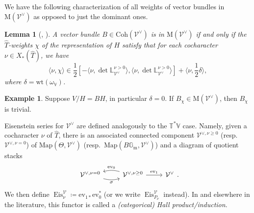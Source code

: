 \documentclass{amsart}
\newtheorem{lemma}[theorem]{Lemma}
\theoremstyle{definition}
\newtheorem{example}[theorem]{Example}
\theoremstyle{remark}
\numberwithin{equation}{section}
\newcommand{\mc}{\mathcal}
\newcommand{\Gm}{{\mathbb{G}_{\mathrm{m}}}}
\newcommand{\wh}{\widehat}
\DeclareMathOperator{\Eis}{\mathrm{Eis}}
\newcommand{\Coh}{\mathrm{Coh}}
\newcommand{\V}{\mathbb{V}}
\newcommand{\T}{\mathbb{T}}
\renewcommand{\L}{\mathbb{L}}
\newcommand{\Map}{\mathrm{Map}}
\newcommand{\ev}{\mathrm{ev}}
\newcommand{\wt}{\mathrm{wt}}
\newcommand{\M}{\mathrm{M}}
\begin{document}
We have the following characterization of all weights of vector bundles in $\M(\mc{V}^{\vee})$ as opposed to just the dominant ones.
\begin{lemma}[{\cite[Lemma 2.34]{PTqBPSsymquiverswithpotential}, \cite[Lemma 2.9]{HalpernLeistnerSam}}]{\label{lem: magicvbweightcharacterization}}
A vector bundle $B \in \Coh(\mc{V}^{\vee})$ is in $\M(\mc{V}^{\vee})$ if and only if the $\wh T$-weights $\chi$ of the representation of $H$ satisfy that for each cocharacter $\nu \in X_{\ast}(\wh T)$, we have
\begin{equation}\label{eq: MagicAllWeights}
    \langle \nu, \chi \rangle \in \frac{1}{2}\left[ -\langle\nu , \det \L^{\nu > 0}_{\mc{V}^{\vee}} \rangle,   \langle \nu, \det \L^{\nu > 0}_{\mc{V}^{\vee}} \rangle \right] + \langle \nu, \frac{1}{2}\delta \rangle,
\end{equation}
where $\delta =  \wt(\omega_{\V})$. 
\end{lemma}

\begin{example}\label{ex: MagicCategoryExample}
Suppose $V/H=BH$, in particular $\delta=0$. If $B_\chi\in \M(\mc V^\vee)$, then $B_\chi$ is trivial. 
\end{example}

Eisenstein series for $\mc{V}^{\vee}$ are defined analogously to the $\T^{\ast}\V$ case. Namely, given a cocharacter $\nu$ of $\wh{T}$, there is an associated connected component $\mc{V}^{\vee, \nu \geq 0}$ (resp.~$\mc{V}^{\vee, \nu = 0}$) of $\Map(\Theta, \mc{V}^{\vee})$ (resp.~$\Map(B\Gm, \mc{V}^{\vee})$) and a diagram of quotient stacks
    \begin{equation*}
    \begin{tikzcd}
        \mc{V}^{\vee, \nu = 0} \arrow[r, swap, bend right=15, "{\sigma}"] & \mc{V}^{\vee, \nu \geq 0} \arrow[r, "{\ev_1}"] \arrow[l,swap, bend right=15, "{\ev_0}"] & \mc{V}^{\vee}
    \end{tikzcd}.
\end{equation*}
We then define $\Eis^{\mc{V}}_{\nu} \coloneq \ev_{1 \ast}\ev^{\ast}_0$ (or we write $\Eis^{\mc V}_{P_\nu}$ instead). In \cite{PTDolbeault} and elsewhere in the literature, this functor is called a \emph{(categorical) Hall product/induction}.
\end{document}
